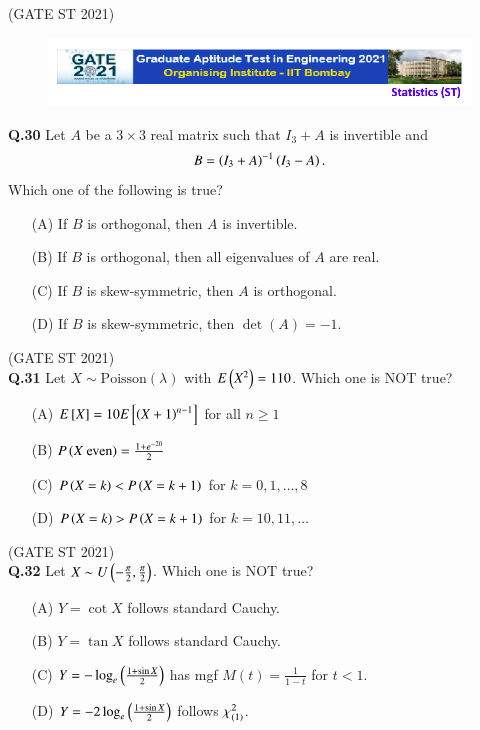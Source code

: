 \documentclass[journal,12pt,onecolumn]{IEEEtran}
\theoremstyle{remark}
\begin{document}
\hfill (GATE ST 2021) \\
\begin{figure}
 \centering
    \includegraphics[width=1\linewidth]{figs/0.png} 
\end{figure}
\textbf{Q.30}
Let $A$ be a $3\times 3$ real matrix such that $I_3 + A$ is invertible and
\[
B = \left(I_3 + A\right)^{-1}\left(I_3 - A\right).
\]
Which one of the following is true?
\begin{enumerate}
\item[(A)] If $B$ is orthogonal, then $A$ is invertible.
\item[(B)] If $B$ is orthogonal, then all eigenvalues of $A$ are real.
\item[(C)] If $B$ is skew-symmetric, then $A$ is orthogonal.
\item[(D)] If $B$ is skew-symmetric, then $\det(A) = -1$.
\end{enumerate}

\hfill (GATE ST 2021) \\
\textbf{Q.31}
Let $X \sim \text{Poisson}(\lambda)$ with $E\left(X^2\right) = 110$. Which one is NOT true?
\begin{enumerate}
\item[(A)] $E{}\left[X\right] = 10 E{}\left[\left(X+1\right)^{n-1}\right]$ for all $n \ge 1$
\item[(B)] $P\left(X \ \text{even}\right) = \frac{1 + e^{-20}}{2}$
\item[(C)] $P\left(X = k\right) < P\left(X = k+1\right)$ for $k = 0, 1, \dots, 8$
\item[(D)] $P\left(X = k\right) > P\left(X = k+1\right)$ for $k = 10, 11, \dots$
\end{enumerate}

\hfill (GATE ST 2021) \\
\textbf{Q.32}
Let $X \sim U\left(-\frac{\pi}{2}, \frac{\pi}{2}\right)$. Which one is NOT true?
\begin{enumerate}
\item[(A)] $Y = \cot X$ follows standard Cauchy.
\item[(B)] $Y = \tan X$ follows standard Cauchy.
\item[(C)] $Y = -\log_e \left(\frac{1+ \sin X}{2}\right)$ has mgf $M(t) = \frac{1}{1-t}$ for $t<1$.
\item[(D)] $Y = -2\log_e\left( \frac{1 + \sin X}{2} \right)$ follows $\chi^2_{\left(1\right)}$.
\end{enumerate}
\end{document}
